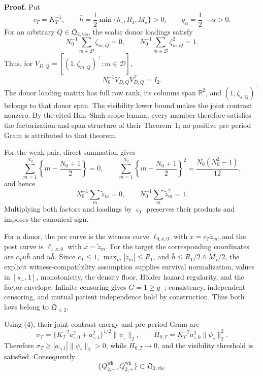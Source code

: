 \textbf{Proof.}
Put
\[
 c_T=K_T^{-1},
 \qquad \bar h=\frac12\min\{h_\circ,R_1,M_\star\}>0,
 \qquad q_\alpha=\frac12-\alpha>0.                       \tag{1}
\]
For an arbitrary \(Q\in\mathfrak Q_{2,\mathrm{vis}}\), the scalar donor loadings satisfy
\[
 N_0^{-1}\sum_{m\in\mathcal D}\zeta_{m,Q}=0,
 \qquad N_0^{-1}\sum_{m\in\mathcal D}\zeta_{m,Q}^2=1. \tag{2}
\]
Thus, for \(V_{D,Q}=[(1,\zeta_{m,Q})^\top:m\in\mathcal D]\),
\[
 N_0^{-1}V_{D,Q}V_{D,Q}^\top=I_2.                       \tag{3}
\]
The donor loading matrix has full row rank, its columns span \(\mathbb R^2\), and \((1,\zeta_{\star,Q})^\top\) belongs to that donor span.  The visibility lower bound makes the joint contrast nonzero.  By the cited Han--Shah scope lemma, every member therefore satisfies the factorization-and-span structure of their Theorem~1; no positive pre-period Gram is attributed to that theorem.

For the weak pair, direct summation gives
\[
 \sum_{m=1}^{N_0}\left\{m-\frac{N_0+1}{2}\right\}=0,
 \qquad
 \sum_{m=1}^{N_0}\left\{m-\frac{N_0+1}{2}\right\}^2
 =\frac{N_0(N_0^2-1)}{12},
\]
and hence
\[
 N_0^{-1}\sum_m\widetilde z_m=0,
 \qquad N_0^{-1}\sum_m\widetilde z_m^2=1.              \tag{4}
\]
Multiplying both factors and loadings by \(\varsigma_T\) preserves their products and imposes the canonical sign.

For a donor, the pre curve is the witness curve \(\ell_{0,x,0}\) with \(x=c_T\widetilde z_m\), and the post curve is \(\ell_{1,x,0}\) with \(x=\widetilde z_m\).  For the target the corresponding coordinates are \(c_Tu\bar h\) and \(u\bar h\).  Since \(c_T\le1\), \(\max_m|\widetilde z_m|\le R_1\), and \(\bar h\le R_1/2\wedge M_\star/2\), the explicit witness-compatibility assumption supplies survival normalization, values in \([s_-,1]\), monotonicity, the density floor, H\"older hazard regularity, and the factor envelope.  Infinite censoring gives \(G=1\ge g_-\); consistency, independent censoring, and mutual patient independence hold by construction.  Thus both laws belong to \(\mathfrak Q_{\le2}\).

Using (4), their joint contrast energy and pre-period Gram are
\[
 \sigma_T=\{K_T^{-2}a_{\circ,0}^2+a_{\circ,1}^2\}^{1/2}
 \|\psi_\circ\|_2,
 \qquad
 H_{0,T}=K_T^{-2}a_{\circ,0}^2\|\psi_\circ\|_2^2.      \tag{5}
\]
Therefore \(\sigma_T\ge|a_{\circ,1}|\|\psi_\circ\|_2>0\), while \(H_{0,T}\to0\), and the visibility threshold is satisfied.  Consequently
\[
 \{Q_{2,-}^{\mathrm{wk}},Q_{2,+}^{\mathrm{wk}}\}
 \subset\mathfrak Q_{2,\mathrm{vis}}.                   \tag{6}
\]

